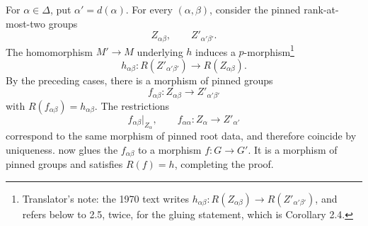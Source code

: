 For \(\alpha\in\Delta\), put \(\alpha'=d(\alpha)\). For every
\((\alpha,\beta)\), consider the pinned rank-at-most-two groups
\[
  Z_{\alpha\beta},\qquad Z'_{\alpha'\beta'}.
\]
The homomorphism \(M'\to M\) underlying \(h\) induces a
\(p\)-morphism\footnote{Translator's note: the 1970 text writes
\(h_{\alpha\beta}:R(Z_{\alpha\beta})\to R(Z'_{\alpha'\beta'})\), and refers below to 2.5,
twice, for the gluing statement, which is Corollary 2.4.}
\[
  h_{\alpha\beta}:R(Z'_{\alpha'\beta'})
    \longrightarrow R(Z_{\alpha\beta}).
\]
By the preceding cases, there is a morphism of pinned groups
\[
  f_{\alpha\beta}:Z_{\alpha\beta}
    \longrightarrow Z'_{\alpha'\beta'}
\]
with \(R(f_{\alpha\beta})=h_{\alpha\beta}\). The restrictions
\[
  f_{\alpha\beta}|_{Z_\alpha},
  \qquad f_{\alpha\alpha}:Z_\alpha\to Z'_{\alpha'}
\]
correspond to the same morphism of pinned root data, and therefore
coincide by uniqueness.  now glues the
\(f_{\alpha\beta}\) to a morphism \(f:G\to G'\). It is a morphism of
pinned groups and satisfies \(R(f)=h\), completing the proof.
